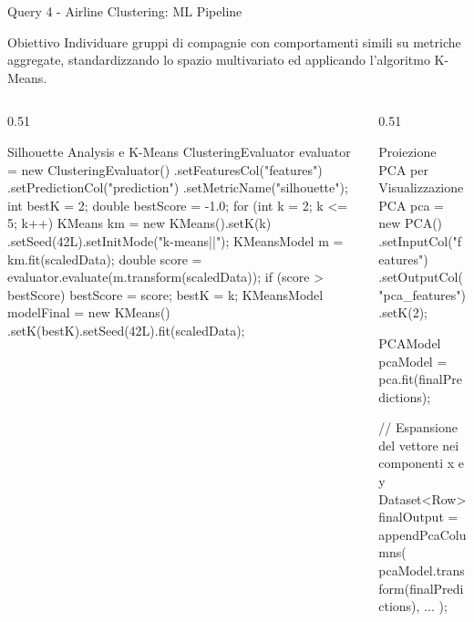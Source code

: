 \documentclass[10pt, aspectratio=169]{beamer}
\newcommand{\queryobjective}[1]{
    \vspace{-0.5cm}
    \begin{exampleblock}{\footnotesize Obiettivo}
    \scriptsize #1
    \end{exampleblock}
    \vfill
}
\begin{document}
\begin{frame}[fragile, t]{Query 4 - Airline Clustering: ML Pipeline}

    \queryobjective{Individuare gruppi di compagnie con comportamenti simili su metriche aggregate, standardizzando lo spazio multivariato ed applicando l'algoritmo K-Means.}

    \begin{columns}[c]

        \begin{column}{0.51\textwidth}
            \begin{appcodebox}{Silhouette Analysis e K-Means}
ClusteringEvaluator evaluator = new ClusteringEvaluator()
    .setFeaturesCol("features")
    .setPredictionCol("prediction")
    .setMetricName("silhouette");
int bestK = 2; double bestScore = -1.0;
for (int k = 2; k <= 5; k++) {
    KMeans km = new KMeans().setK(k)
        .setSeed(42L).setInitMode("k-means||");
    KMeansModel m = km.fit(scaledData);
    double score = evaluator.evaluate(m.transform(scaledData));
    if (score > bestScore) {
        bestScore = score; bestK = k; }
}
KMeansModel modelFinal = new KMeans()
    .setK(bestK).setSeed(42L).fit(scaledData);
            \end{appcodebox}
        \end{column}

        \begin{column}{0.51\textwidth}
            \begin{appcodebox}{Proiezione PCA per Visualizzazione}
PCA pca = new PCA()
    .setInputCol("features")
    .setOutputCol("pca_features")
    .setK(2);

PCAModel pcaModel = pca.fit(finalPredictions);

// Espansione del vettore nei componenti x e y
Dataset<Row> finalOutput = appendPcaColumns(
    pcaModel.transform(finalPredictions), ...
);
            \end{appcodebox}
        \end{column}

    \end{columns}

\end{frame}
\end{document}
